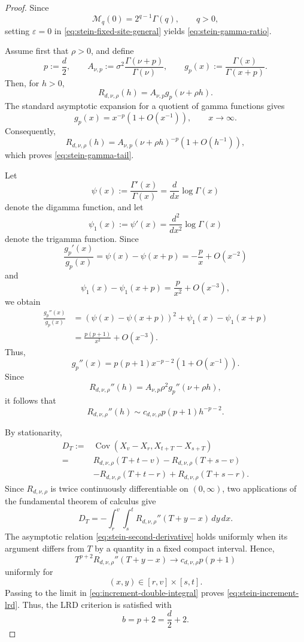 \documentclass[preprint,12pt,authoryear]{elsarticle}
\begin{document}
\begin{proof}
Since
\[
\mathcal{M}_{q}(0)
=
2^{q-1}\Gamma(q),
\qquad q>0,
\]
setting \(\varepsilon=0\) in
\eqref{eq:stein-fixed-site-general} yields
\eqref{eq:stein-gamma-ratio}.

Assume first that \(\rho>0\), and define
\[
p:=\frac d2,
\qquad
A_{\nu,p}
:=
\sigma^2\frac{\Gamma(\nu+p)}{\Gamma(\nu)},
\qquad
g_p(x)
:=
\frac{\Gamma(x)}{\Gamma(x+p)}.
\]
Then, for \(h>0\),
\[
R_{d,\nu,\rho}(h)
=
A_{\nu,p}g_p(\nu+\rho h).
\]
The standard asymptotic expansion for a quotient of gamma functions gives
\[
g_p(x)
=
x^{-p}\left(1+O(x^{-1})\right),
\qquad x\to\infty.
\]
Consequently,
\[
R_{d,\nu,\rho}(h)
=
A_{\nu,p}
(\nu+\rho h)^{-p}
\left(1+O(h^{-1})\right),
\]
which proves \eqref{eq:stein-gamma-tail}.

Let
\[
\psi(x)
:=
\frac{\Gamma'(x)}{\Gamma(x)}
=
\frac{d}{dx}\log\Gamma(x)
\]
denote the digamma function, and let
\[
\psi_1(x)
:=
\psi'(x)
=
\frac{d^2}{dx^2}\log\Gamma(x)
\]
denote the trigamma function. Since
\[
\frac{g_p'(x)}{g_p(x)}
=
\psi(x)-\psi(x+p)
=
-\frac{p}{x}+O(x^{-2})
\]
and
\[
\psi_1(x)-\psi_1(x+p)
=
\frac{p}{x^2}+O(x^{-3}),
\]
we obtain
\[
\begin{aligned}
\frac{g_p''(x)}{g_p(x)}
&=
\left(
\psi(x)-\psi(x+p)
\right)^2
+
\psi_1(x)-\psi_1(x+p)
\\
&=
\frac{p(p+1)}{x^2}
+
O(x^{-3}).
\end{aligned}
\]
Thus,
\[
g_p''(x)
=
p(p+1)x^{-p-2}
\left(1+O(x^{-1})\right).
\]
Since
\[
R_{d,\nu,\rho}''(h)
=
A_{\nu,p}\rho^2
g_p''(\nu+\rho h),
\]
it follows that
\begin{equation}\label{eq:stein-second-derivative}
R_{d,\nu,\rho}''(h)
\sim
c_{d,\nu,\rho}
p(p+1)h^{-p-2}.
\end{equation}

By stationarity,
\[
\begin{aligned}
D_T
:={}&
\operatorname{Cov}
\left(
X_v-X_r,
X_{t+T}-X_{s+T}
\right)
\\
={}&
R_{d,\nu,\rho}(T+t-v)
-
R_{d,\nu,\rho}(T+s-v)
\\
&-
R_{d,\nu,\rho}(T+t-r)
+
R_{d,\nu,\rho}(T+s-r).
\end{aligned}
\]
Since \(R_{d,\nu,\rho}\) is twice continuously differentiable on
\((0,\infty)\), two applications of the fundamental theorem of calculus give
\begin{equation}\label{eq:increment-double-integral}
D_T
=
-\int_r^v\int_s^t
R_{d,\nu,\rho}''(T+y-x)
\,dy\,dx.
\end{equation}
The asymptotic relation
\eqref{eq:stein-second-derivative} holds uniformly when its argument differs from \(T\) by a quantity in a fixed compact interval. Hence,
\[
T^{p+2}
R_{d,\nu,\rho}''(T+y-x)
\longrightarrow
c_{d,\nu,\rho}p(p+1)
\]
uniformly for
\[
(x,y)\in[r,v]\times[s,t].
\]
Passing to the limit in
\eqref{eq:increment-double-integral} proves
\eqref{eq:stein-increment-lrd}. Thus, the LRD criterion is satisfied with
\[
b=p+2=\frac d2+2.
\]


\end{proof}
\end{document}
